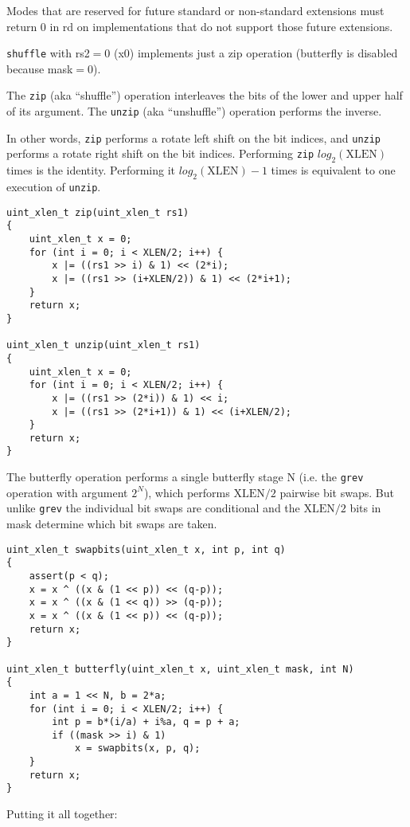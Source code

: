Modes that are reserved for future standard or non-standard extensions must return
0 in rd on implementations that do not support those future extensions.

\texttt{shuffle} with rs2$=$0 (x0) implements just a zip operation (butterfly is
disabled because mask$=$0).

The \texttt{zip} (aka ``shuffle'') operation interleaves the bits of the lower and upper
half of its argument. The \texttt{unzip} (aka ``unshuffle'') operation performs the inverse.

In other words, \texttt{zip} performs a rotate left shift on the bit indices,
and \texttt{unzip} performs a rotate right shift on the bit indices.
Performing \texttt{zip} $log_2(\textrm{XLEN})$ times is the identity. Performing it
$log_2(\textrm{XLEN})-1$ times is equivalent to one execution of \texttt{unzip}.

\begin{verbatim}
uint_xlen_t zip(uint_xlen_t rs1)
{
    uint_xlen_t x = 0;
    for (int i = 0; i < XLEN/2; i++) {
        x |= ((rs1 >> i) & 1) << (2*i);
        x |= ((rs1 >> (i+XLEN/2)) & 1) << (2*i+1);
    }
    return x;
}

uint_xlen_t unzip(uint_xlen_t rs1)
{
    uint_xlen_t x = 0;
    for (int i = 0; i < XLEN/2; i++) {
        x |= ((rs1 >> (2*i)) & 1) << i;
        x |= ((rs1 >> (2*i+1)) & 1) << (i+XLEN/2);
    }
    return x;
}
\end{verbatim}

The butterfly operation performs a single butterfly stage N (i.e. the {\tt grev} operation
with argument $2^N$), which performs $\textrm{XLEN}/2$ pairwise bit swaps. But unlike
{\tt grev} the individual bit swaps are conditional and the $\textrm{XLEN}/2$
bits in mask determine which bit swaps are taken.

\begin{verbatim}
uint_xlen_t swapbits(uint_xlen_t x, int p, int q)
{
    assert(p < q);
    x = x ^ ((x & (1 << p)) << (q-p));
    x = x ^ ((x & (1 << q)) >> (q-p));
    x = x ^ ((x & (1 << p)) << (q-p));
    return x;
}

uint_xlen_t butterfly(uint_xlen_t x, uint_xlen_t mask, int N)
{
    int a = 1 << N, b = 2*a;
    for (int i = 0; i < XLEN/2; i++) {
        int p = b*(i/a) + i%a, q = p + a;
        if ((mask >> i) & 1)
            x = swapbits(x, p, q);
    }
    return x;
}
\end{verbatim}

Putting it all together:

